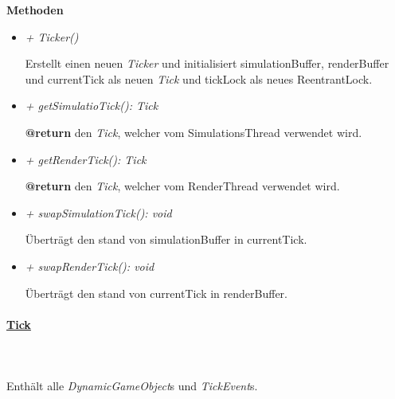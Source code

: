         \textbf{Methoden}
        \begin{itemize}
            \item \textit{+ Ticker()}
                \begin{leftbar}[0.9\linewidth]
                    Erstellt einen neuen \textit{Ticker} und initialisiert simulationBuffer, renderBuffer und currentTick als neuen \textit{Tick} und tickLock
                    als neues ReentrantLock.
                \end{leftbar}
            \item \textit{+ getSimulatioTick(): Tick}
                \begin{leftbar}[0.9\linewidth]
                    \textbf{@return} den \textit{Tick}, welcher vom SimulationsThread verwendet wird.
                \end{leftbar}
            \item \textit{+ getRenderTick(): Tick}
                \begin{leftbar}[0.9\linewidth]
                    \textbf{@return} den \textit{Tick}, welcher vom RenderThread verwendet wird.
                \end{leftbar}
            \item \textit{+ swapSimulationTick(): void}
                \begin{leftbar}[0.9\linewidth]
                    Überträgt den stand von simulationBuffer in currentTick.
                \end{leftbar}
            \item \textit{+ swapRenderTick(): void}
                \begin{leftbar}[0.9\linewidth]
                    Überträgt den stand von currentTick in renderBuffer.
                \end{leftbar}
        \end{itemize}

    \pagebreak
    \paragraph{\underline{Tick}} \mbox{}\\
    \\
        Enthält alle \textit{DynamicGameObject}s und \textit{TickEvent}s.\par
        
